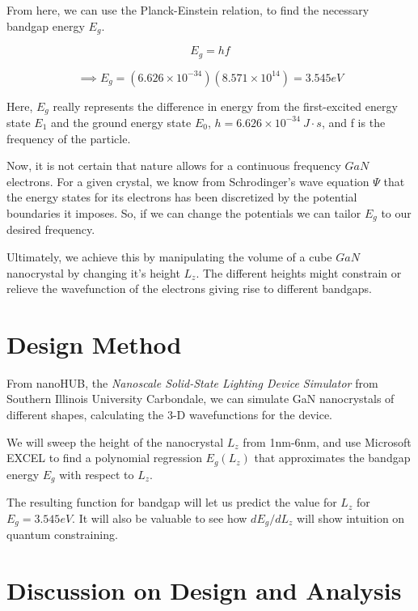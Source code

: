 \documentclass{IEEEtran}
\begin{document}
From here, we can use the Planck-Einstein relation, to find the necessary bandgap energy \(E_g\).

\begin{equation}
    E_g = hf
\end{equation}

\begin{equation*}
    \implies E_g = (6.626 \times 10^{-34})(8.571 \times 10^{14}) = 3.545 eV
\end{equation*}

Here, \(E_g\) really represents the difference in energy from the first-excited energy state \(E_1\) and the ground energy state \(E_0\), \(h = 6.626 \times 10^{-34} ~ J\cdot s\), and f is the frequency of the particle.

Now, it is not certain that nature allows for a continuous frequency \(GaN\) electrons. For a given crystal, we know from Schrodinger's wave equation \(\Psi\) that the energy states for its electrons has been discretized by the potential boundaries it imposes. So, if we can change the potentials we can tailor \(E_g\) to our desired frequency.

Ultimately, we achieve this by manipulating the volume of a cube \(GaN\) nanocrystal by changing it's height \(L_z\). The different heights might constrain or relieve the wavefunction of the electrons giving rise to different bandgaps.


\section{Design Method}

From nanoHUB, the \textit{Nanoscale Solid-State Lighting Device Simulator} \cite{simulator} from Southern Illinois University Carbondale, we can simulate GaN nanocrystals of different shapes, calculating the 3-D wavefunctions for the device.

We will sweep the height of the nanocrystal \(L_z\) from 1nm-6nm, and use Microsoft EXCEL to find a polynomial regression \(E_g(L_z)\) that approximates the bandgap energy \(E_g\) with respect to \(L_z\).

The resulting function for bandgap will let us predict the value for \(L_z\) for \(E_g = 3.545eV\). It will also be valuable to see how \(dE_g / dL_z\) will show intuition on quantum constraining.

\section{Discussion on Design and Analysis}
\end{document}
